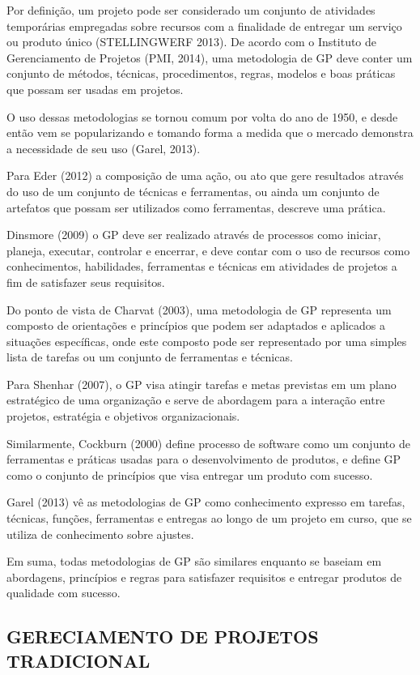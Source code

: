 Por definição, um projeto pode ser considerado um conjunto de atividades temporárias empregadas sobre recursos com a finalidade de entregar um serviço ou produto único (STELLINGWERF 2013). De acordo com o Instituto de Gerenciamento de Projetos (PMI, 2014), uma metodologia de GP deve conter um conjunto de métodos, técnicas, procedimentos, regras, modelos e boas práticas que possam ser usadas em projetos.

O uso dessas metodologias se tornou comum por volta do ano de 1950, e desde então vem se popularizando e tomando forma a medida que o mercado demonstra a necessidade de seu uso (Garel, 2013).

Para Eder (2012) a composição de uma ação, ou ato que gere resultados através do uso de um conjunto de técnicas e ferramentas, ou ainda um conjunto de artefatos que possam ser utilizados como ferramentas, descreve uma prática.

Dinsmore (2009) o GP deve ser realizado através de processos como iniciar, planeja, executar, controlar e encerrar, e deve contar com o uso de recursos como conhecimentos, habilidades, ferramentas e técnicas em atividades de projetos a fim de satisfazer seus requisitos.

Do ponto de vista de Charvat (2003), uma metodologia de GP representa um composto de orientações e princípios que podem ser adaptados e aplicados a situações específicas, onde este composto pode ser representado por uma simples lista de tarefas ou um conjunto de ferramentas e técnicas.

Para Shenhar (2007), o GP visa atingir tarefas e metas previstas em um plano estratégico de uma organização e serve de abordagem para a interação entre projetos, estratégia e objetivos organizacionais.

Similarmente, Cockburn (2000) define processo de software como um conjunto de ferramentas e práticas usadas para o desenvolvimento de produtos, e define GP como o conjunto de princípios que visa entregar um produto com sucesso.

Garel (2013) vê as metodologias de GP como conhecimento expresso em tarefas, técnicas, funções, ferramentas e entregas ao longo de um projeto em curso, que se utiliza de conhecimento sobre ajustes.

Em suma, todas metodologias de GP são similares enquanto se baseiam em abordagens, princípios e regras para satisfazer requisitos e entregar produtos de qualidade com sucesso.


\subsection{GERECIAMENTO DE PROJETOS TRADICIONAL}

